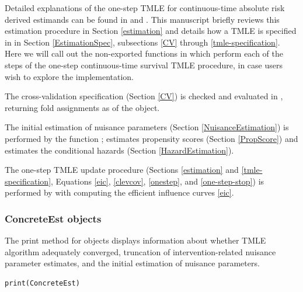 \documentclass{report}
\newcommand{\1}{\ensuremath{\mathbf{1}}}
\begin{document}
Detailed explanations of the one-step TMLE for continuous-time absolute risk derived estimands can be found in \cite{rytgaard_one-step_2021} and \cite{rytgaard_continuous-time_2021}. This manuscript briefly reviews this estimation procedure in Section \ref{estimation} and details how a TMLE is specified in  in Section \ref{EstimationSpec}, subsections \ref{CV} through \ref{tmle-specification}. Here we will call out the non-exported functions in  which perform each of the steps of the one-step continuous-time survival TMLE procedure, in case users wish to explore the implementation.

The cross-validation specification (Section \ref{CV}) is checked and evaluated in , returning fold assignments as  of the  object.

The initial estimation of nuisance parameters (Section \ref{NuisanceEstimation}) is performed by the function ;  estimates propensity scores (Section \ref{PropScore}) and  estimates the conditional hazards (Section \ref{HazardEstimation}).

The one-step TMLE update procedure (Sections \ref{estimation} and \ref{tmle-specification}, Equations \eqref{eic}, \eqref{clevcov}, \eqref{onestep}, and \eqref{one-step-stop}) is performed by  with  computing the efficient influence curves \eqref{eic}.

\subsubsection{ConcreteEst objects}
\label{concreteest}
The print method for  objects displays information about whether TMLE algorithm adequately converged, truncation of intervention-related nuisance parameter estimates, and the initial estimation of nuisance parameters.

\begin{lstlisting}
print(ConcreteEst)
\end{lstlisting}
\end{document}
